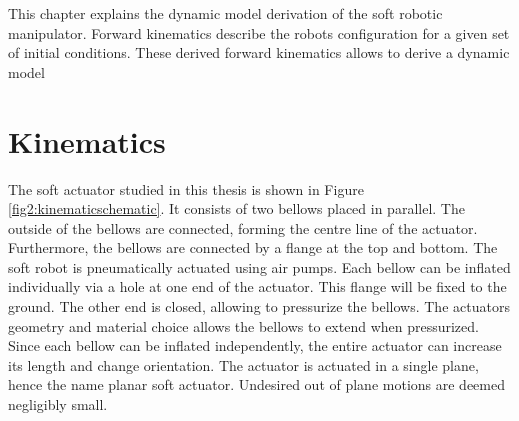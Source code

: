 This chapter explains the dynamic model derivation of the soft robotic manipulator. Forward kinematics describe the robots configuration for a given set of initial conditions. These derived forward kinematics allows to derive a dynamic model 

\section{Kinematics}

The soft actuator studied in this thesis is shown in Figure \ref{fig2:kinematicschematic}. It consists of two bellows placed in parallel. The outside of the bellows are connected, forming the centre line of the actuator. Furthermore, the bellows are connected by a flange at the top and bottom. The soft robot is pneumatically actuated using air pumps. Each bellow can be inflated individually via a hole at one end of the actuator. This flange will be fixed to the ground. The other end is closed, allowing to pressurize the bellows. The actuators geometry and material choice allows the bellows to extend when pressurized. Since each bellow can be inflated independently, the entire actuator can increase its length and change orientation. The actuator is actuated in a single plane, hence the name planar soft actuator. Undesired out of plane motions are deemed negligibly small.

